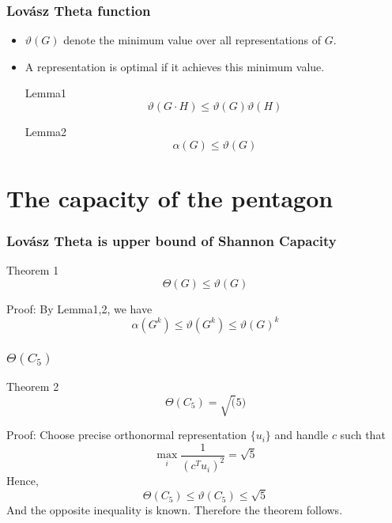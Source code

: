 \documentclass{beamer}
\begin{document}
\begin{frame}
\frametitle{Lov\'{a}sz Theta function}
\begin{itemize}
\item $\vartheta (G)$ denote the minimum value over all representations of $G$. 
\item A representation is optimal if it achieves this minimum value.
\begin{block}{Lemma1}
\[
\vartheta (G \cdot H) \leq \vartheta (G) \vartheta (H)
\]
\end{block}
\begin{block}{Lemma2}
\[
\alpha (G) \leq \vartheta (G) 
\]
\end{block}

\end{itemize}
\end{frame}


\section{The capacity of the pentagon}

\begin{frame}
\frametitle{Lov\'{a}sz Theta is upper bound of Shannon Capacity}

\begin{alertblock}{Theorem 1}
\[
\Theta (G) \leq \vartheta (G)
\]
\end{alertblock}

Proof: By Lemma1,2, we have
\[
\alpha (G^k) \leq \vartheta (G^k) \leq \vartheta (G)^k
\]

\end{frame}

\begin{frame}
\frametitle{$\Theta (C_5)$}

\begin{block}{Theorem 2}
\[
\Theta (C_5) = \sqrt(5)
\]
\end{block}

Proof: Choose precise orthonormal representation $\{u_i\}$ and handle $c$ such that 
\[
\max_{i} \frac{1}{(c^T u_i)^2}=\sqrt{5}
\]
Hence,
\[
\Theta (C_5) \leq \vartheta(C_5) \leq \sqrt{5}
\]
And the opposite inequality is known. Therefore the theorem follows.

\end{frame}
\end{document}
